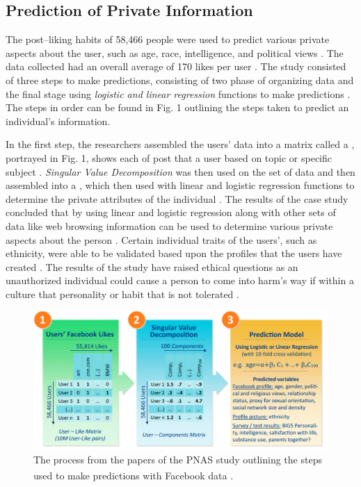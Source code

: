 \documentclass[a4paper, 12pt]{article}
\begin{document}
\subsection{Prediction of Private Information}
\begin{paragraph}
\indent The post--liking habits of 58,466 people were used to predict various private aspects about the user, such as age, race, intelligence, and political views \cite{Kosinski2013}. The data collected had an overall average of 170 likes per user \cite{Kosinski2013}. The study consisted of three steps to make predictions, consisting of two phase of organizing data and the final stage using \textit{logistic and linear regression} functions to make predictions \cite{Kosinski2013}. The steps in order can be found in Fig. 1 outlining the steps taken to predict an individual's information.  
\par
\indent In the first step, the researchers assembled the users' data into a matrix called a , portrayed in Fig. 1, shows each of post that a user based on topic or specific subject \cite{Kosinski2013}. \textit{Singular Value Decomposition} was then used on the set of data and then assembled into a , which then used with linear and logistic regression functions to determine the private attributes of the individual \cite{Kosinski2013}. The results of the case study concluded that by using linear and logistic regression along with other sets of data like web browsing information can be used to determine various private aspects about the person \cite{Kosinski2013}. Certain individual traits of the users', such as ethnicity, were able to be validated based upon the profiles that the users have created \cite{Kosinski2013}. The results of the study have raised ethical questions as an unauthorized individual could cause a person to come into harm's way if within a culture that personality or habit that is not tolerated \cite{Kosinski2013}.

\begin{figure}[ht]
\centering
\includegraphics[scale=0.30]{PNAS}
\caption{The process from the papers of the PNAS study outlining the steps used to make predictions with Facebook\textsuperscript{\textregistered} data \cite{Kosinski2013}.}
\end{figure}

\end{paragraph}
\end{document}
